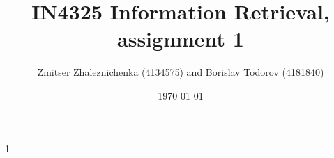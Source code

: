 \documentclass[a4paper, notitlepage]{report}
\begin{document}
\title{IN4325 Information Retrieval, assignment 1}
\author{Zmitser Zhaleznichenka (4134575) and Borislav Todorov (4181840)}
\date{\today}
\maketitle

\begin{description}
\item[1] \hfill

\end{description}
\end{document}

